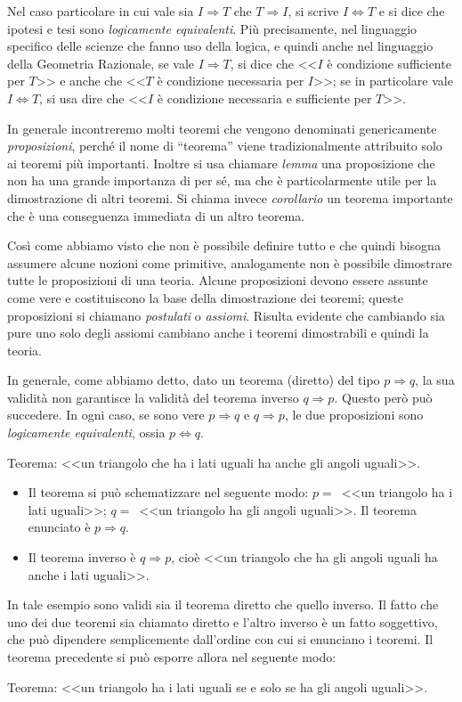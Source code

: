 Nel caso particolare in cui vale sia $I\Rightarrow T$ che 
$T\Rightarrow I$, si scrive  $I\Leftrightarrow T$ e si dice che 
ipotesi e tesi sono \emph{logicamente equivalenti}. Più precisamente, 
nel linguaggio specifico delle scienze che fanno uso della logica, e 
quindi anche nel linguaggio della Geometria Razionale, se vale 
$I\Rightarrow T$, si dice che <<$I$ è condizione sufficiente per 
$T$>> e anche che <<$T$ è condizione necessaria per $I$>>; se in 
particolare vale  $I\Leftrightarrow T$, si usa dire che <<$I$ è 
condizione necessaria e sufficiente per $T$>>.

In generale incontreremo molti teoremi che vengono denominati 
genericamente \emph{proposizioni}, perché il nome di ``teorema'' 
viene tradizionalmente attribuito solo ai teoremi più importanti. 
Inoltre si usa chiamare \emph{lemma} una proposizione che non ha una 
grande importanza di per sé, ma che è particolarmente utile per la 
dimostrazione di altri teoremi. Si chiama invece \emph{corollario} un 
teorema importante che è una conseguenza immediata di un altro 
teorema.

Così come abbiamo visto che non è possibile definire tutto e che 
quindi bisogna assumere alcune nozioni come primitive, analogamente 
non è possibile dimostrare tutte le proposizioni di una teoria. 
Alcune proposizioni devono essere assunte come vere e costituiscono la 
base della dimostrazione dei teoremi; queste proposizioni si chiamano 
\emph{postulati} o \emph{assiomi}. Risulta evidente che cambiando sia 
pure uno solo degli assiomi cambiano anche i teoremi dimostrabili e 
quindi la teoria.

In generale, come abbiamo detto, dato un teorema (diretto) del tipo 
$p\Rightarrow q$, la sua validità non garantisce la validità del 
teorema inverso $q\Rightarrow p$. Questo però può succedere. In ogni 
caso, se sono vere $p\Rightarrow q$ e $q\Rightarrow p$, le due 
proposizioni sono \emph{logicamente equivalenti}, ossia 
$p\Leftrightarrow q$.
\begin{exrig}
  \begin{esempio}
    Teorema: <<un triangolo che ha i lati uguali ha anche gli 
angoli uguali>>.
    \begin{itemize}
      \item Il teorema si può schematizzare nel seguente 
modo: $p=$~<<un triangolo ha i lati uguali>>; $q=$~<<un triangolo ha 
gli angoli uguali>>. Il teorema enunciato è $p\Rightarrow q$.
      \item  Il teorema inverso è  $q\Rightarrow p$, cioè 
<<un triangolo che ha gli angoli uguali ha anche i lati uguali>>.
    \end{itemize}
    In tale esempio sono validi sia il teorema diretto che quello 
    inverso. Il fatto che uno dei due teoremi sia chiamato diretto e 
    l'altro inverso è un fatto soggettivo, che può dipendere 
    semplicemente dall'ordine con cui si enunciano i teoremi.
    Il teorema precedente si può esporre allora nel seguente modo:
    \item Teorema: <<un triangolo ha i lati uguali se e solo se ha 
gli angoli uguali>>.
  \end{esempio}
\end{exrig}

